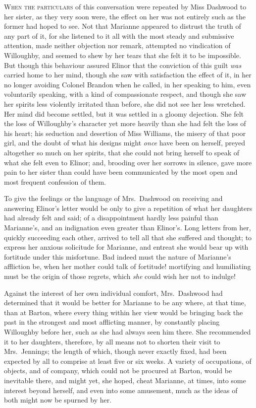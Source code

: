 \documentclass{article}
\newcommand{\gintro}[1]{\textcolor{gcolor}{\textsc{#1}}}
\begin{document}
\gintro{When the particulars} of this conversation were repeated
by Miss Dashwood to her sister, as they very soon were,
the effect on her was not entirely such as the former
had hoped to see.  Not that Marianne appeared to distrust
the truth of any part of it, for she listened to it all
with the most steady and submissive attention, made neither
objection nor remark, attempted no vindication of Willoughby,
and seemed to shew by her tears that she felt it to
be impossible.  But though this behaviour assured Elinor
that the conviction of this guilt \emph{was} carried home to
her mind, though she saw with satisfaction the effect of it,
in her no longer avoiding Colonel Brandon when he called,
in her speaking to him, even voluntarily speaking,
with a kind of compassionate respect, and though she
saw her spirits less violently irritated than before,
she did not see her less wretched.  Her mind did become
settled, but it was settled in a gloomy dejection.
She felt the loss of Willoughby's character yet more heavily
than she had felt the loss of his heart; his seduction and
desertion of Miss Williams, the misery of that poor girl,
and the doubt of what his designs might \emph{once} have been
on herself, preyed altogether so much on her spirits,
that she could not bring herself to speak of what she felt
even to Elinor; and, brooding over her sorrows in silence,
gave more pain to her sister than could have been communicated
by the most open and most frequent confession of them.

To give the feelings or the language of Mrs.\ Dashwood
on receiving and answering Elinor's letter would be only
to give a repetition of what her daughters had already felt
and said; of a disappointment hardly less painful than
Marianne's, and an indignation even greater than Elinor's.
Long letters from her, quickly succeeding each other,
arrived to tell all that she suffered and thought;
to express her anxious solicitude for Marianne, and entreat
she would bear up with fortitude under this misfortune.
Bad indeed must the nature of Marianne's affliction be,
when her mother could talk of fortitude! mortifying
and humiliating must be the origin of those regrets,
which \emph{she} could wish her not to indulge!

Against the interest of her own individual comfort,
Mrs.\ Dashwood had determined that it would be better for
Marianne to be any where, at that time, than at Barton,
where every thing within her view would be bringing back
the past in the strongest and most afflicting manner,
by constantly placing Willoughby before her, such as
she had always seen him there.  She recommended it to
her daughters, therefore, by all means not to shorten their
visit to Mrs.\ Jennings; the length of which, though never
exactly fixed, had been expected by all to comprise at least
five or six weeks.  A variety of occupations, of objects,
and of company, which could not be procured at Barton,
would be inevitable there, and might yet, she hoped,
cheat Marianne, at times, into some interest beyond herself,
and even into some amusement, much as the ideas of both
might now be spurned by her.
\end{document}
